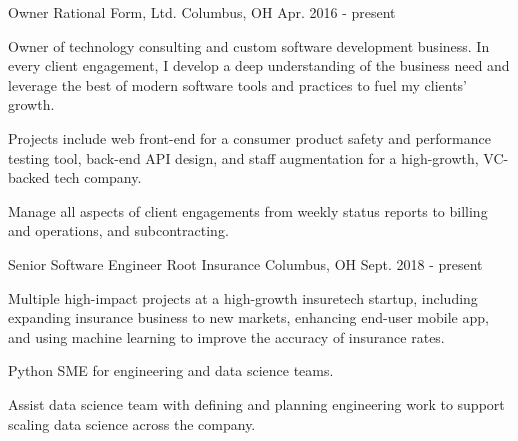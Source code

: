 

\begin{cventries}

  \cventry
    {Owner} %
    {Rational Form, Ltd.} %
    {Columbus, OH} %
    {Apr. 2016 - present} %
    {
      \begin{cvitems} %
        \item {Owner of technology consulting and custom software development business. In every client engagement, I develop a deep understanding of the business need and leverage the best of modern software tools and practices to fuel my clients' growth.}
        \item {Projects include web front-end for a consumer product safety and performance testing tool,
        back-end API design, and staff augmentation for a high-growth, VC-backed tech company.}
        \item {Manage all aspects of client engagements from weekly status reports to billing and operations,
        and subcontracting.}
      \end{cvitems}
    }

  \cventry
    {Senior Software Engineer} %
    {Root Insurance} %
    {Columbus, OH} %
    {Sept. 2018 - present} %
    {
      \begin{cvitems} %
        \item {Multiple high-impact projects at a high-growth insuretech startup,
          including expanding insurance business to new markets,
          enhancing end-user mobile app,
          and using machine learning to improve the accuracy of insurance rates.}
        \item {Python SME for engineering and data science teams.}
        \item {Assist data science team with defining and planning engineering work to support scaling data science across the company.}
      \end{cvitems}
    }


\end{cventries}
